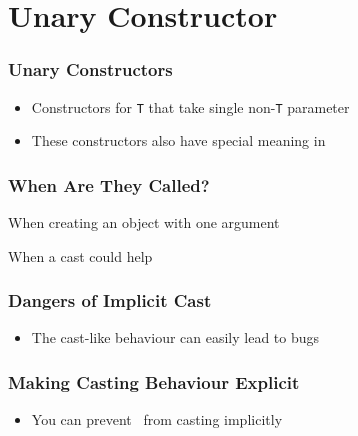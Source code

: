 \section{Unary Constructor}

\frame{\tableofcontents[currentsection]}

\begin{frame}
  \frametitle{Unary Constructors}
  \begin{itemize}
    \item Constructors for \texttt{T} that take single non-\texttt{T} parameter
    \item These constructors also have special meaning in \cpp
  \end{itemize}
  \vskip5mm
\end{frame}

\begin{frame}
  \frametitle{When Are They Called?}
  \begin{overprint}
  \end{overprint}
  \vskip5mm
  \begin{overprint}
    \begin{center}
      When creating an object with one argument
    \end{center}
    \begin{center}
      When a cast could help
    \end{center}
  \end{overprint}
\end{frame}

\begin{frame}
  \frametitle{Dangers of Implicit Cast}
  \begin{itemize}
    \item The cast-like behaviour can easily lead to bugs
  \end{itemize}
\end{frame}

\begin{frame}
  \frametitle{Making Casting Behaviour Explicit}
  \begin{itemize}
    \item You can prevent \cpp\ from casting implicitly
  \end{itemize}
\end{frame}




